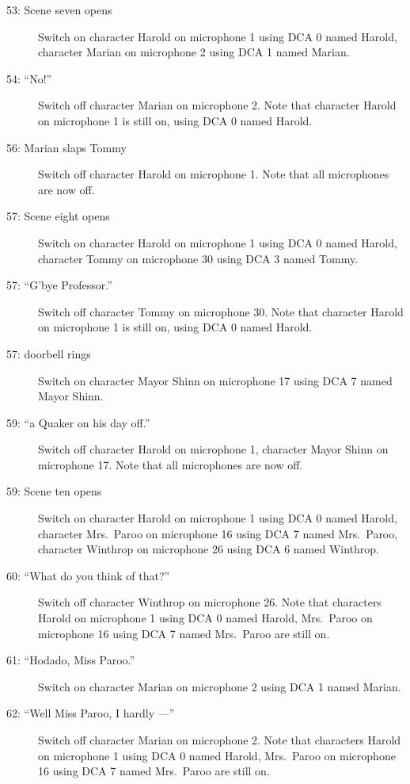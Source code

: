 \begin{description}
\item[53: Scene seven opens]
Switch on character Harold on microphone 1 using DCA 0 named Harold, character Marian on microphone 2 using DCA 1 named Marian. 

\item[54: ``No!'']
Switch off character Marian on microphone 2. Note that character Harold on microphone 1 is still on, using DCA 0 named Harold.

\item[56: Marian slaps Tommy]
Switch off character Harold on microphone 1. Note that all microphones are now off.

\item[57: Scene eight opens]
Switch on character Harold on microphone 1 using DCA 0 named Harold, character Tommy on microphone 30 using DCA 3 named Tommy. 

\item[57: ``G'bye Professor.'']
Switch off character Tommy on microphone 30. Note that character Harold on microphone 1 is still on, using DCA 0 named Harold.

\item[57: doorbell rings]
Switch on character Mayor Shinn on microphone 17 using DCA 7 named Mayor Shinn. 

\item[59: ``a Quaker on his day off.'']
Switch off character Harold on microphone 1, character Mayor Shinn on microphone 17. Note that all microphones are now off.

\item[59: Scene ten opens]
Switch on character Harold on microphone 1 using DCA 0 named Harold, character Mrs.~Paroo on microphone 16 using DCA 7 named Mrs.~Paroo, character Winthrop on microphone 26 using DCA 6 named Winthrop. 

\item[60: ``What do you think of that?'']
Switch off character Winthrop on microphone 26. Note that characters Harold on microphone 1 using DCA 0 named Harold, Mrs.~Paroo on microphone 16 using DCA 7 named Mrs.~Paroo are still on.  

\item[61: ``Hodado, Miss Paroo.'']
Switch on character Marian on microphone 2 using DCA 1 named Marian. 

\item[62: ``Well Miss Paroo, I hardly ---'']
Switch off character Marian on microphone 2. Note that characters Harold on microphone 1 using DCA 0 named Harold, Mrs.~Paroo on microphone 16 using DCA 7 named Mrs.~Paroo are still on.  


\end{description}
